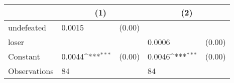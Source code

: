 {
\def\sym#1{\ifmmode^{#1}\else\(^{#1}\)\fi}
\begin{tabular*}{.7\hsize}{@{\hskip\tabcolsep\extracolsep\fill}l*{2}{lc}}
\toprule
                &\multicolumn{2}{c}{(1)}     &\multicolumn{2}{c}{(2)}     \\
\midrule
undefeated      &   0.0015         &   (0.00)&                  &         \\
loser           &                  &         &   0.0006         &   (0.00)\\
Constant        &   0.0044\sym{***}&   (0.00)&   0.0046\sym{***}&   (0.00)\\
\midrule
Observations    &       84         &         &       84         &         \\
\bottomrule
\end{tabular*}
}
